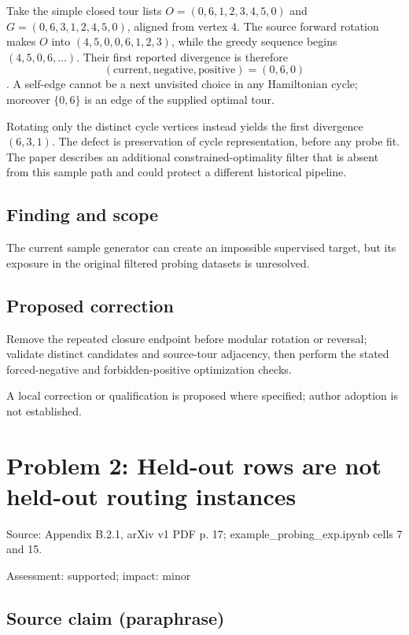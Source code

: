 \documentclass[11pt]{article}
\begin{document}
Take the simple closed tour lists \(O=(0,6,1,2,3,4,5,0)\) and \(G=(0,6,3,1,2,4,5,0)\), aligned from vertex \(4\). The source forward rotation makes \(O\) into \((4,5,0,0,6,1,2,3)\), while the greedy sequence begins \((4,5,0,6,\ldots)\). Their first reported divergence is therefore \[(\mathrm{current},\mathrm{negative},\mathrm{positive})=(0,6,0)\]. A self-edge cannot be a next unvisited choice in any Hamiltonian cycle; moreover \(\{0,6\}\) is an edge of the supplied optimal tour.

Rotating only the distinct cycle vertices instead yields the first divergence \((6,3,1)\). The defect is preservation of cycle representation, before any probe fit. The paper describes an additional constrained-optimality filter that is absent from this sample path and could protect a different historical pipeline.

\subsection*{Finding and scope}

The current sample generator can create an impossible supervised target, but its exposure in the original filtered probing datasets is unresolved.

\subsection*{Proposed correction}

Remove the repeated closure endpoint before modular rotation or reversal; validate distinct candidates and source-tour adjacency, then perform the stated forced-negative and forbidden-positive optimization checks.

A local correction or qualification is proposed where specified; author adoption is not established.

\section*{Problem 2: Held-out rows are not held-out routing instances}

Source: Appendix B.2.1, arXiv v1 PDF p. 17; example\_probing\_exp.ipynb cells 7 and 15.

Assessment: supported; impact: minor

\subsection*{Source claim (paraphrase)}
\end{document}
